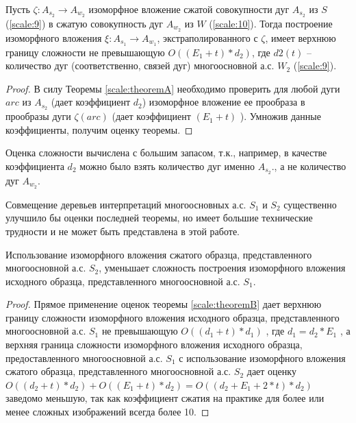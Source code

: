 \begin{theorem}
Пусть  $\zeta : A_{s_2} \to A_{w_2}$  изоморфное вложение сжатой совокупности дуг $A_{s_2}$  из $S$ (\ref{scale:9}) в  сжатую  совокупность дуг $A_{w_2}$ из  $W$ (\ref{scale:10}). Тогда  построение изоморфного вложения  $\xi : A_{s_1} \to A_{w_1}$,   экстраполированного с  $\zeta$, имеет верхнюю границу сложности не превышающую $O((E_1 + t)* d_2)$,  где  $d2(t)$ – количество дуг (соответственно, связей дуг) многоосновной  а.с. $W_2$ (\ref{scale:9}).
\end{theorem}
\begin{proof}
В силу Теоремы \ref{scale:theoremA} необходимо проверить для любой дуги  $arc$  из $A_{s_2}$  (дает коэффициент $d_2$) изоморфное вложение  ее прообраза  в  прообразы дуги $\zeta(arc)$ (дает коэффициент  $(E_1 + t)$ ). Умножив данные коэффициенты,  получим оценку теоремы.                        
\end{proof}           

\begin{remark}
Оценка сложности вычислена с большим запасом, т.к., например, в качестве коэффициента $d_2$  можно было взять количество  дуг именно  $A_{s_2}$., а не количество  дуг  $A_{w_2}$.
\end{remark}

\begin{remark}
Совмещение деревьев интерпретаций   многоосновных  а.с. $S_1$  и  $S_2$ существенно улучшило бы оценки последней теоремы, но имеет большие технические трудности и не может быть представлена  в этой работе.
\end{remark}

\begin{theorem} 
Использование изоморфного вложения сжатого образца, представленного  многоосновной  а.с. $S_2$,  уменьшает сложность построения изоморфного вложения исходного образца, представленного  многоосновной  а.с.  $S_1$.
\label{scale:theorem:3}
\end{theorem}

\begin{proof}
Прямое применение оценок теоремы \ref{scale:theoremB}  дает верхнюю границу сложности изоморфного вложения исходного образца, представленного  многоосновной  а.с. $S_1$  не превышающую $O((d_1 + t)* d_1)$ , где  $d_1 = d_2 * E_1$ , а верхняя граница  сложности изоморфного вложения исходного образца, предоставленного  многоосновной  а.с.   $S_1$  с использование изоморфного вложения сжатого образца, представленного  многоосновной  а.с.  $S_2$ дает оценку $O((d_2 + t)* d_2) +  O((E_1 + t)* d_2) =  O((d_2 + E_1 + 2 * t ) * d_2 )$ заведомо меньшую, так как коэффициент сжатия на практике для более или менее сложных изображений всегда более 10.
\end{proof}
                  
